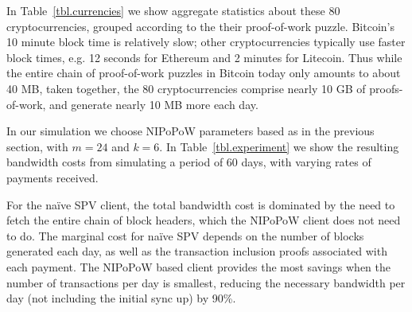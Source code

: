 In Table~\ref{tbl.currencies} we show aggregate statistics about these 80 cryptocurrencies, grouped according to the their proof-of-work puzzle.
Bitcoin's 10 minute block time is relatively slow; other cryptocurrencies typically use faster block times, e.g. 12 seconds for Ethereum and 2 minutes for Litecoin. Thus while the entire chain of proof-of-work puzzles in Bitcoin today only amounts to about 40 MB, taken together, the 80 cryptocurrencies comprise nearly 10 GB of proofs-of-work, and generate nearly 10 MB more each day.

 In our simulation we choose NIPoPoW parameters based as in the previous section, with $m=24$ and $k=6$.
In Table~\ref{tbl.experiment} we show the resulting bandwidth costs from simulating a period of 60 days, with varying rates of payments received.

 For the na\"ive SPV client, the total bandwidth cost is dominated by the need to fetch the entire chain of block headers, which the NIPoPoW client does not need to do. The marginal cost for na\"ive SPV depends on the number of blocks generated each day, as well as the transaction inclusion proofs associated with each payment. The NIPoPoW based client provides the most savings when the number of transactions per day is smallest, reducing the necessary bandwidth per day (not including the initial sync up) by 90\%.

